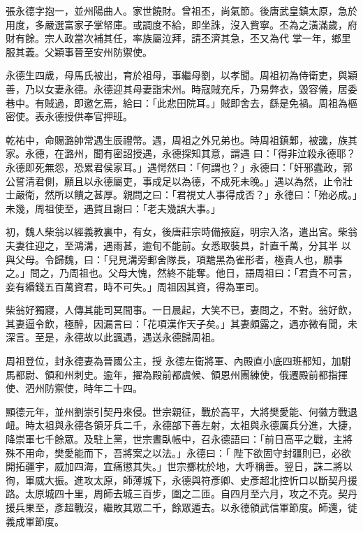 \begin{pinyinscope}
 張永德字抱一，並州陽曲人。家世饒財。曾祖丕，尚氣節。後唐武皇鎮太原，急於用度，多嚴選富家子掌帑庫。或調度不給，即坐誅，沒入貲寧。丕為之潢滿歲，府財有餘。宗人政當次補其任，率族屬泣拜，請丕濟其急，丕又為代
 掌一年，鄉里服其義。父穎事晉至安州防禦使。



 永德生四歲，母馬氏被出，育於祖母，事繼母劉，以孝聞。周祖初為侍衛吏，與穎善，乃以女妻永德。永德迎其母妻詣宋州。時寇賊充斥，乃易弊衣，毀容儀，居委巷中。有賊過，即邀乞焉，給曰：「此悲田院耳。」賊即舍去，繇是免禍。周祖為樞密使。表永德授供奉官押班。



 乾祐中，命賜潞帥常遇生辰禮幣。遇，周祖之外兄弟也。時周祖鎮鄴，被讒，族其家。永德，在潞州，聞有密詔授遇，永德探知其意，謂遇
 曰：「得非泣殺永德耶？永德即死無怨，恐累君侯家耳。」遇愕然曰：「何謂也？」永德曰：「奸邪蠹政，郭公誓清君側，願且以永德屬吏，事成足以為德，不成死未晚。」遇以為然，止令壯士嚴衛，然所以饋之甚厚。親問之曰：「君視丈人事得成否？」永德曰：「殆必成。」未幾，周祖使至，遇賀且謝曰：「老夫幾誤大事。」



 初，魏人柴翁以經義教裏中，有女，後唐莊宗時備掖庭，明宗入洛，遣出宮。柴翁夫妻往迎之，至鴻溝，遇雨甚，逾旬不能前。女悉取裝具，計直千萬，分其半
 以與父母。令歸魏，曰：「兒見溝旁郵舍隊長，項黵黑為雀形者，極貴人也，願事之。」問之，乃周祖也。父母大愧，然終不能奪。他日，語周祖曰：「君貴不可言，妾有緡錢五百萬資君，時不可失。」周祖因其資，得為軍司。



 柴翁好獨寢，人傳其能司冥間事。一日晨起，大笑不已，妻問之，不對。翁好飲，其妻逼令飲，極醉，因漏言曰：「花項漢作天子矣。」其妻頗露之，遇亦微有聞，未深言。至是，永德故以此諷遇，遇送永德歸周祖。



 周祖登位，封永德妻為晉國公主，授
 永德左衛將軍、內殿直小底四班都知，加駙馬都尉、領和州刺史。逾年，擢為殿前都虞候、領恩州團練使，俄遷殿前都指揮使、泗州防禦使，時年二十四。



 顯德元年，並州劉崇引契丹來侵。世宗親征，戰於高平，大將樊愛能、何徽方戰退衄。時太祖與永德各領牙兵二千，永德部下善左射，太祖與永德厲兵分進，大捷，降崇軍七千餘眾。及駐上黨，世宗晝臥帳中，召永德語曰：「前日高平之戰，主將殊不用命，樊愛能而下，吾將案之以法。」永德曰：「
 陛下欲固守封疆則已，必欲開拓疆宇，威加四海，宜痛懲其失。」世宗擲枕於地，大呼稱善。翌日，誅二將以徇，軍威大振。進攻太原，師薄城下，永德與符彥卿、史彥超北控忻口以斷契丹援路。太原城四十里，周師去城三百步，圍之二匝。自四月至六月，攻之不克。契丹援兵果至，彥超戰沒，繼敗其眾二千，餘眾遁去。以永德領武信軍節度。師還，徙義成軍節度。




\end{pinyinscope}
